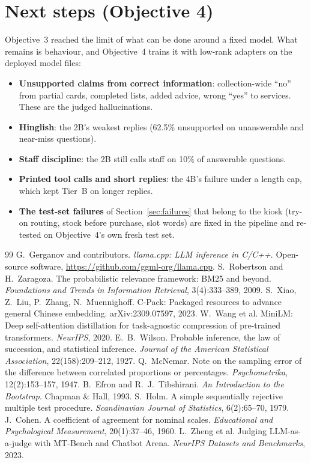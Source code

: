 \documentclass[11pt,a4paper]{article}
\begin{document}
\section{Next steps (Objective 4)}\label{sec:next}
Objective~3 reached the limit of what can be done around a fixed model. What remains is behaviour, and Objective~4 trains
it with low-rank adapters on the deployed model files:
\begin{itemize}
  \item \textbf{Unsupported claims from correct information}: collection-wide ``no'' from partial cards, completed lists,
        added advice, wrong ``yes'' to services. These are the judged hallucinations.
  \item \textbf{Hinglish}: the 2B's weakest replies (62.5\% unsupported on unanswerable and near-miss questions).
  \item \textbf{Staff discipline}: the 2B still calls staff on 10\% of answerable questions.
  \item \textbf{Printed tool calls and short replies}: the 4B's failure under a length cap, which kept Tier~B on longer
        replies.
  \item \textbf{The test-set failures} of Section~\ref{sec:failures} that belong to the kiosk (try-on routing, stock
        before purchase, slot words) are fixed in the pipeline and re-tested on Objective~4's own fresh test set.
\end{itemize}

\begin{thebibliography}{99}
 G.~Gerganov and contributors. \emph{llama.cpp: LLM inference in C/C++}. Open-source software,
  \url{https://github.com/ggml-org/llama.cpp}.
 S.~Robertson and H.~Zaragoza. The probabilistic relevance framework: BM25 and beyond. \emph{Foundations
  and Trends in Information Retrieval}, 3(4):333--389, 2009.
 S.~Xiao, Z.~Liu, P.~Zhang, N.~Muennighoff. C-Pack: Packaged resources to advance general Chinese
  embedding. arXiv:2309.07597, 2023.
 W.~Wang et al. MiniLM: Deep self-attention distillation for task-agnostic compression of pre-trained
  transformers. \emph{NeurIPS}, 2020.
 E.~B.~Wilson. Probable inference, the law of succession, and statistical inference. \emph{Journal of
  the American Statistical Association}, 22(158):209--212, 1927.
 Q.~McNemar. Note on the sampling error of the difference between correlated proportions or
  percentages. \emph{Psychometrika}, 12(2):153--157, 1947.
 B.~Efron and R.~J.~Tibshirani. \emph{An Introduction to the Bootstrap}. Chapman \& Hall, 1993.
 S.~Holm. A simple sequentially rejective multiple test procedure. \emph{Scandinavian Journal of
  Statistics}, 6(2):65--70, 1979.
 J.~Cohen. A coefficient of agreement for nominal scales. \emph{Educational and Psychological
  Measurement}, 20(1):37--46, 1960.
 L.~Zheng et al. Judging LLM-as-a-judge with MT-Bench and Chatbot Arena. \emph{NeurIPS Datasets and
  Benchmarks}, 2023.
\end{thebibliography}
\end{document}
